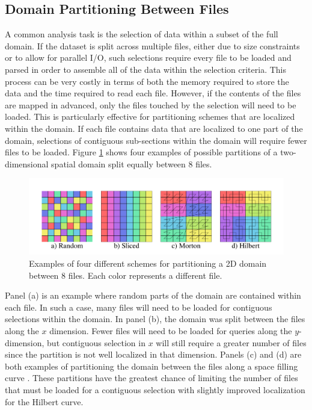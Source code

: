 \documentclass[apjl]{emulateapj}
\begin{document}
\subsection{Domain Partitioning Between Files}\label{SS:decomp}
A common analysis task is the selection of data within a subset of the full domain. If the dataset is split across multiple files, either due to size constraints or to allow for parallel I/O, such selections require every file to be loaded and parsed in order to assemble all of the data within the selection criteria. This process can be very costly in terms of both the memory required to store the data and the time required to read each file. However, if the contents of the files are mapped in advanced, only the files touched by the selection will need to be loaded. This is particularly effective for partitioning schemes that are localized within the domain. If each file contains data that are localized to one part of the domain, selections of contiguous sub-sections within the domain will require fewer files to be loaded. Figure \ref{fig:files} shows four examples of possible partitions of a two-dimensional spatial domain split equally between 8 files. 
%
\begin{figure}[htbp]
\begin{center}
\includegraphics[width=\columnwidth,keepaspectratio]{../images/files.png}
\caption{Examples of four different schemes for partitioning a 2D domain between 8 files. Each color represents a different file.}
\label{fig:files}
\end{center}
\end{figure}
%

Panel (a) is an example where random parts of the domain are contained within each file. In such a case, many files will need to be loaded for contiguous selections within the domain. In panel (b), the domain was split between the files along the $x$ dimension. Fewer files will need to be loaded for queries along the $y$-dimension, but contiguous selection in $x$ will still require a greater number of files since the partition is not well localized in that dimension. Panels (c) and (d) are both examples of partitioning the domain between the files along a space filling curve \citep[Morton and Hilbert curves respectively;][]{Morton1996,Hilbert1970}. These partitions have the greatest chance of limiting the number of files that must be loaded for a contiguous selection with slightly improved localization for the Hilbert curve.
\end{document}

